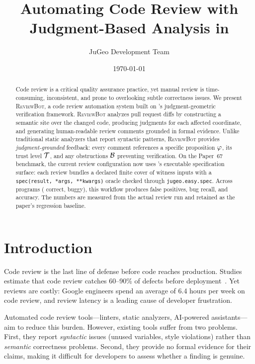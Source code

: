 \documentclass[11pt]{article}
\title{Automating Code Review with\\Judgment-Based Analysis in \JuGeo}
\author{JuGeo Development Team}
\date{\today}
\newcommand{\ReviewBot}{\textsc{ReviewBot}}
\begin{document}
\maketitle

\begin{abstract}
Code review is a critical quality assurance practice, yet manual review is
time-consuming, inconsistent, and prone to overlooking subtle correctness
issues. We present \ReviewBot{}, a code review automation system built on
\JuGeo{}'s judgment-geometric verification framework. \ReviewBot{} analyzes
pull request diffs by constructing a semantic site over the changed code,
producing judgments for each affected coordinate, and generating
human-readable review comments grounded in formal evidence. Unlike
traditional static analyzers that report syntactic patterns, \ReviewBot{}
provides \emph{judgment-grounded} feedback: every comment references a
specific proposition $\varphi$, its trust level $\mathcal{T}$, and any obstructions
$\mathcal{B}$ preventing verification. On the Paper~67 benchmark, the current
review configuration now uses \JuGeo{}'s executable specification surface:
each review bundles a declared finite cover of witness inputs with a
\texttt{spec(result, *args, **kwargs)} oracle checked through
\texttt{jugeo.easy.spec}.
Across \ppLXVIIprogramCount{} programs (\ppLXVIIcorrectCount{} correct,
\ppLXVIIbuggyCount{} buggy), this workflow produces \ppLXVIIfpRate{} false
positives, \ppLXVIIdetectedPct{} bug recall, and \ppLXVIIaccuracyPct{}
accuracy. The numbers are measured from the actual review run and retained as
the paper's regression baseline.
\end{abstract}

\section{Introduction}\label{sec:intro}

Code review is the last line of defense before code reaches production.
Studies estimate that code review catches 60--90\% of defects before
deployment~\cite{bacchelli2013expectations}. Yet reviews are costly: Google
engineers spend an average of 6.4 hours per week on code review, and review
latency is a leading cause of developer frustration.

Automated code review tools---linters, static analyzers, AI-powered
assistants---aim to reduce this burden. However, existing tools suffer from
two problems. First, they report \emph{syntactic} issues (unused variables,
style violations) rather than \emph{semantic} correctness problems. Second,
they provide no formal evidence for their claims, making it difficult for
developers to assess whether a finding is genuine.
\end{document}
